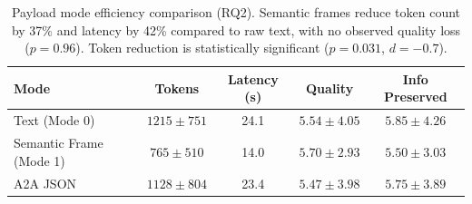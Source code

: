 \begin{table}[t]
\centering
\caption{Payload mode efficiency comparison (RQ2). Semantic frames reduce token count by 37\% and latency by 42\% compared to raw text, with no observed quality loss ($p=0.96$). Token reduction is statistically significant ($p=0.031$, $d=-0.7$).}
\label{tab:payload}
\begin{tabular}{lcccc}
\toprule
Mode & Tokens & Latency (s) & Quality & Info Preserved \\
\midrule
Text (Mode 0) & $1215 \pm 751$ & 24.1 & $5.54 \pm 4.05$ & $5.85 \pm 4.26$ \\
Semantic Frame (Mode 1) & $765 \pm 510$ & 14.0 & $5.70 \pm 2.93$ & $5.50 \pm 3.03$ \\
A2A JSON & $1128 \pm 804$ & 23.4 & $5.47 \pm 3.98$ & $5.75 \pm 3.89$ \\
\bottomrule
\end{tabular}
\end{table}